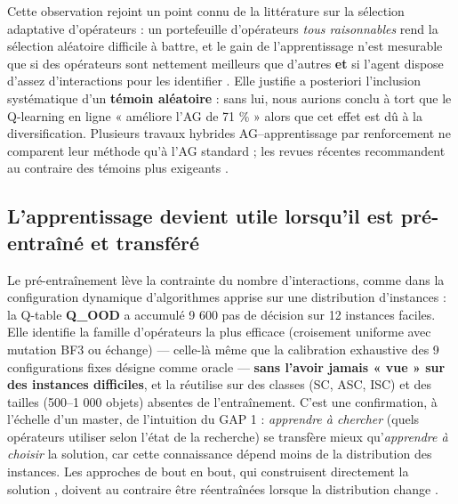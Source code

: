 \documentclass[
  french,
  11pt,
  a4paper,
]{article}
\begin{document}
Cette observation rejoint un point connu de la littérature sur la
sélection adaptative d'opérateurs : un portefeuille d'opérateurs
\emph{tous raisonnables} rend la sélection aléatoire difficile à battre,
et le gain de l'apprentissage n'est mesurable que si des opérateurs sont
nettement meilleurs que d'autres \textbf{et} si l'agent dispose d'assez
d'interactions pour les identifier
\autocite{dacosta_2008,karimi-mamaghan_machine_2022}. Elle justifie a
posteriori l'inclusion systématique d'un \textbf{témoin aléatoire} :
sans lui, nous aurions conclu à tort que le Q-learning en ligne «
améliore l'AG de 71 \% » alors que cet effet est dû à la
diversification. Plusieurs travaux hybrides AG--apprentissage par
renforcement ne comparent leur méthode qu'à l'AG standard
\autocite{pettinger_everson_2002,chen_slga_2020,cui_hybrid_2024} ; les
revues récentes recommandent au contraire des témoins plus exigeants
\autocite{song_reinforcement_2023,li_bridging_2025}.

\subsection{L'apprentissage devient utile lorsqu'il est pré-entraîné et
transféré}\label{discussion-lapprentissage-devient-utile-lorsquil-est-pruxe9-entrauxeenuxe9-et-transfuxe9ruxe9}

Le pré-entraînement lève la contrainte du nombre d'interactions, comme
dans la configuration dynamique d'algorithmes apprise sur une
distribution d'instances \autocite{biedenkapp_2020,benjamins_2024} : la
Q-table \textbf{Q\_OOD} a accumulé 9 600 pas de décision sur 12
instances faciles. Elle identifie la famille d'opérateurs la plus
efficace (croisement uniforme avec mutation BF3 ou échange) --- celle-là
même que la calibration exhaustive des 9 configurations fixes désigne
comme oracle --- \textbf{sans l'avoir jamais « vue » sur des instances
difficiles}, et la réutilise sur des classes (SC, ASC, ISC) et des
tailles (500--1 000 objets) absentes de l'entraînement. C'est une
confirmation, à l'échelle d'un master, de l'intuition du GAP 1 :
\emph{apprendre à chercher} (quels opérateurs utiliser selon l'état de
la recherche) se transfère mieux qu'\emph{apprendre à choisir} la
solution, car cette connaissance dépend moins de la distribution des
instances. Les approches de bout en bout, qui construisent directement
la solution \autocite{bello_2016,kool_2019,kwon_2020}, doivent au
contraire être réentraînées lorsque la distribution change
\autocite{yoshua_bengio_machine_2021,mazyavkina_reinforcement_2021}.
\end{document}
